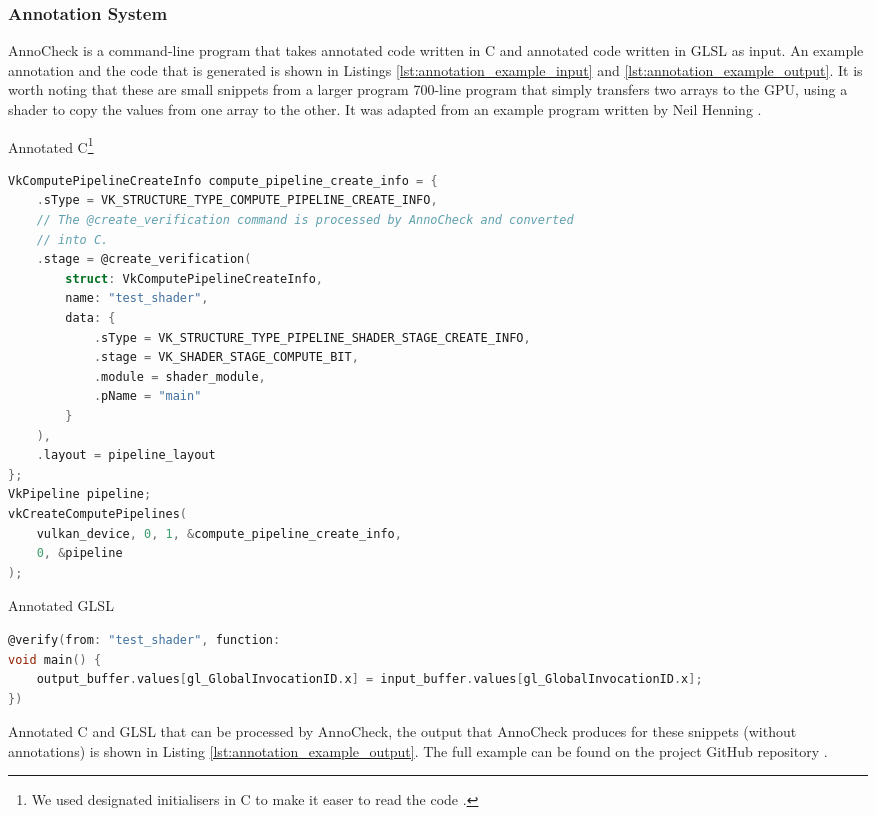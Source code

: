 \documentclass[a4paper,12pt,twoside,openright]{report}
\begin{document}
\subsubsection{Annotation System}

AnnoCheck is a command-line program that takes annotated code written in C and
annotated code written in GLSL as input. An example annotation and the code
that is generated is shown in Listings \ref{lst:annotation_example_input} and
\ref{lst:annotation_example_output}. It is worth noting that these are small
snippets from a larger program 700-line program that simply transfers two
arrays to the GPU, using a shader to copy the values from one array to the
other. It was adapted from an example program written by Neil Henning
\cite{VulkanComputeExampleSource} \cite{VulkanComputeExampleBlog}.

\begin{lstfloat}
\begin{center}
Annotated C\footnote{We used designated initialisers in C to make it easer to
read the code \cite{DesignatedInitC}.}
\end{center}
\begin{lstlisting}[language=C]
VkComputePipelineCreateInfo compute_pipeline_create_info = {
    .sType = VK_STRUCTURE_TYPE_COMPUTE_PIPELINE_CREATE_INFO,
    // The @create_verification command is processed by AnnoCheck and converted
    // into C.
    .stage = @create_verification(
        struct: VkComputePipelineCreateInfo,
        name: "test_shader",
        data: {
            .sType = VK_STRUCTURE_TYPE_PIPELINE_SHADER_STAGE_CREATE_INFO,
            .stage = VK_SHADER_STAGE_COMPUTE_BIT,
            .module = shader_module,
            .pName = "main"
        }
    ),
    .layout = pipeline_layout
};
VkPipeline pipeline;
vkCreateComputePipelines(
    vulkan_device, 0, 1, &compute_pipeline_create_info,
    0, &pipeline
);
\end{lstlisting}
\begin{center} Annotated GLSL \end{center}
\begin{lstlisting}[language=C]
@verify(from: "test_shader", function:
void main() {
    output_buffer.values[gl_GlobalInvocationID.x] = input_buffer.values[gl_GlobalInvocationID.x];
})
\end{lstlisting}
\caption{Annotated C and GLSL that can be processed by AnnoCheck, the output
that AnnoCheck produces for these snippets (without annotations) is shown in
Listing \ref{lst:annotation_example_output}. The full example can be found on
the project GitHub repository \cite{ProjectSource}.}
\label{lst:annotation_example_input}
\end{lstfloat}
\end{document}
